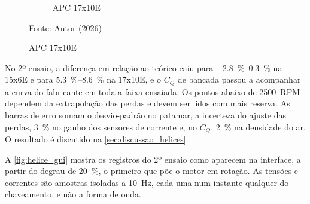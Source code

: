 \begin{figure}[H]
\begin{subfigure}[t]{0.49\textwidth}
        \caption{APC 17x10E}
    \end{subfigure}

    Fonte: Autor (2026)
\end{figure}

No 2º ensaio, a diferença em relação ao teórico caiu para
\SIrange{-2,8}{0,3}{\percent} na 15x6E e para \SIrange{5,3}{8,6}{\percent} na
17x10E, e o $C_Q$ de bancada passou a acompanhar a curva do fabricante em toda
a faixa ensaiada. Os pontos abaixo de \SI{2500}{RPM} dependem da extrapolação
das perdas e devem ser lidos com mais reserva. As barras de erro somam o
desvio-padrão no patamar, a incerteza do ajuste das perdas,
\SI{3}{\percent} no ganho dos sensores de corrente e, no $C_Q$,
\SI{2}{\percent} na densidade do ar. O resultado é discutido na
\autoref{sec:discussao_helices}.

A \autoref{fig:helice_gui} mostra os registros do 2º ensaio como
aparecem na interface, a partir do degrau de \SI{20}{\percent}, o primeiro que
põe o motor em rotação. As tensões e correntes são amostras isoladas a
\SI{10}{\hertz}, cada uma num instante qualquer do chaveamento, e não a forma
de onda.

